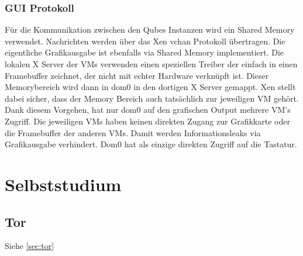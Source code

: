 \subsubsection{GUI Protokoll}
Für die Kommunikation zwischen den Qubes Instanzen wird ein Shared Memory verwendet. Nachrichten werden über das Xen vchan Protokoll übertragen. Die eigentliche Grafikausgabe ist ebenfalls via Shared Memory implementiert. Die lokalen X Server der VMs verwenden einen speziellen Treiber der einfach in einen Framebuffer zeichnet, der nicht mit echter Hardware verknüpft ist. Dieser Memorybereich wird dann in dom0 in den dortigen X Server gemappt. Xen stellt dabei sicher, dass der Memory Bereich auch tatsächlich zur jeweiligen VM gehört. Dank diesem Vorgehen, hat nur dom0 auf den grafischen Output mehrere VM's Zugriff. Die jeweiligen VMs haben keinen direkten Zugang zur Grafikkarte oder die Framebuffer der anderen VMs. Damit werden Informationsleaks via Grafikausgabe verhindert. Dom0 hat als einzige direkten Zugriff auf die Tastatur. 

\section{Selbststudium}
\subsection{Tor}
Siehe \ref{sec:tor}

